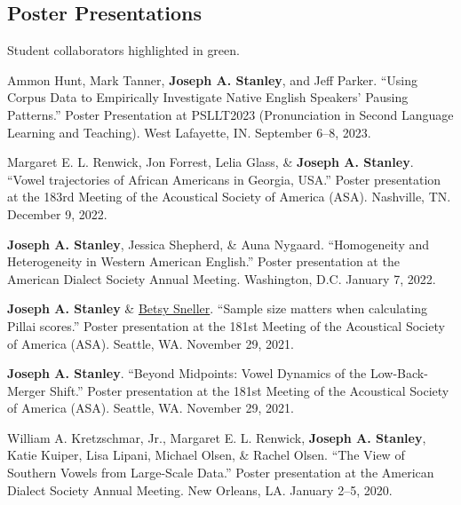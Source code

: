 \documentclass[
]{article}
\begin{document}
\hypertarget{poster-presentations}{%
\subsection{Poster Presentations}\label{poster-presentations}}

\begin{tcolorbox}[enhanced jigsaw, opacityback=0, colback=white, opacitybacktitle=0.6, bottomrule=.15mm, leftrule=.75mm, toprule=.15mm, arc=.35mm, toptitle=1mm, colframe=quarto-callout-note-color-frame, breakable, titlerule=0mm, coltitle=black, colbacktitle=quarto-callout-note-color!10!white, left=2mm, bottomtitle=1mm, title=\textcolor{quarto-callout-note-color}{\faInfo}\hspace{0.5em}{Note}, rightrule=.15mm]

Student collaborators highlighted in {green}.

\end{tcolorbox}

{Ammon Hunt}, Mark Tanner, \textbf{Joseph A. Stanley}, and Jeff Parker.
``Using Corpus Data to Empirically Investigate Native English Speakers'
Pausing Patterns.'' Poster Presentation at PSLLT2023 (Pronunciation in
Second Language Learning and Teaching). West Lafayette, IN. September
6--8, 2023.

Margaret E. L. Renwick, Jon Forrest, Lelia Glass, \& \textbf{Joseph A.
Stanley}. ``Vowel trajectories of African Americans in Georgia, USA.''
Poster presentation at the 183rd Meeting of the Acoustical Society of
America (ASA). Nashville, TN. December 9, 2022.

\textbf{Joseph A. Stanley}, {Jessica Shepherd}, \& {Auna Nygaard}.
``Homogeneity and Heterogeneity in Western American English.'' Poster
presentation at the American Dialect Society Annual Meeting. Washington,
D.C. January 7, 2022.

\textbf{Joseph A. Stanley} \&
\href{https://betsysneller.github.io}{Betsy Sneller}. ``Sample size
matters when calculating Pillai scores.'' Poster presentation at the
181st Meeting of the Acoustical Society of America (ASA). Seattle, WA.
November 29, 2021.

\textbf{Joseph A. Stanley}. ``Beyond Midpoints: Vowel Dynamics of the
Low-Back-Merger Shift.'' Poster presentation at the 181st Meeting of the
Acoustical Society of America (ASA). Seattle, WA. November 29, 2021.

William A. Kretzschmar, Jr., Margaret E. L. Renwick, \textbf{Joseph A.
Stanley}, Katie Kuiper, Lisa Lipani, Michael Olsen, \& Rachel Olsen.
``The View of Southern Vowels from Large-Scale Data.'' Poster
presentation at the American Dialect Society Annual Meeting. New
Orleans, LA. January 2--5, 2020.
\end{document}
